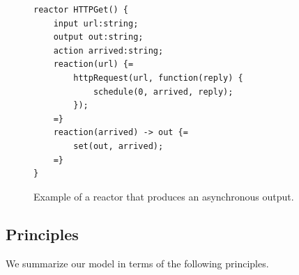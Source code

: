 \documentclass[sigconf]{acmart}
\begin{document}
\begin{figure}[ht]
\begin{lstlisting}[language=LF]
reactor HTTPGet() {
	input url:string;
	output out:string;
	action arrived:string;
	reaction(url) {=
		httpRequest(url, function(reply) {
			schedule(0, arrived, reply);
		});
	=}
	reaction(arrived) -> out {=
		set(out, arrived);
	=}
}
\end{lstlisting}
 \caption{Example of a reactor that produces an asynchronous output.}
 \label{fig:async}
\end{figure}

\subsection{Principles}

We summarize our model in terms of the following principles.
\end{document}
